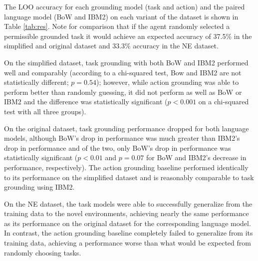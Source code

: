 \documentclass[conference]{IEEEtran}
\begin{document}
The LOO accuracy for each grounding model (task and action) and the paired language model (BoW and IBM2) on each variant of the dataset is shown in Table \ref{tab:res}. Note for comparison that if the agent randomly selected a permissible grounded task it would achieve an expected accuracy of 37.5\% in the simplified and original dataset and 33.3\% accuracy in the NE dataset. 


On the simplified dataset, task grounding with both BoW and IBM2 performed well and comparably (according to a chi-squared test, Bow and IBM2 are not statistically different; $p = 0.54$); however, while action grounding was able to perform better than randomly guessing, it did not perform as well as BoW or IBM2 and the difference was statistically significant ($p < 0.001$ on a chi-squared test with all three groups).

On the original dataset, task grounding performance dropped for both language models, although BoW's drop in performance was much greater than IBM2's drop in performance and of the two, only BoW's drop in performance was statistically significant ($p < 0.01$ and $p = 0.07$ for BoW and IBM2's decrease in performance, respectively). The action grounding baseline performed identically to its performance on the simplified dataset and is reasonably comparable to task grounding using IBM2.

On the NE dataset, the task models were able to successfully generalize from the training data to the novel environments, achieving nearly the same performance as its performance on the original dataset for the corresponding language model. In contrast, the action grounding baseline completely failed to generalize from its training data, achieving a performance worse than what would be expected from randomly choosing tasks.

\end{document}
